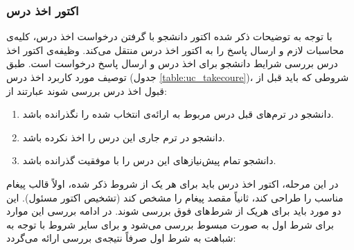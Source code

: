 \subsubsection{ اکتور اخذ درس}
\label{section:takeCourse}
با توجه به توضیحات ذکر شده اکتور دانشجو با گرفتن درخواست اخذ درس، کلیه‌ی محاسبات لازم و ارسال پاسخ را به اکتور اخذ درس منتقل می‌کند. وظیفه‌ی اکتور اخذ درس بررسی شرایط دانشجو برای اخذ درس و ارسال پاسخ درخواست است. طبق توصیف مورد کاربرد اخذ درس (جدول \ref{table:uc_takecoure})، شروطی که باید قبل از قبول اخذ درس بررسی شوند عبارتند از:
\begin{enumerate}
\item دانشجو در ترم‌های قبل درس مربوط به ارائه‌ی انتخاب شده را  نگذرانده باشد.
\item دانشجو در ترم‌ جاری این درس را اخذ نکرده باشد.
\item دانشجو تمام پیش‌نیاز‌های این درس را با موفقیت گذرانده باشد.
\end{enumerate}
در این مرحله، اکتور اخذ درس باید برای هر یک از شروط ذکر شده، اولاً قالب پیغام مناسب را طراحی کند، ثانیاً مقصد پیغام را مشخص کند (تشخیص اکتور مسئول). این دو مورد باید برای هریک از شرط‌های فوق بررسی شوند. در ادامه بررسی این موارد برای شرط اول به صورت مبسوط بررسی می‌شود و برای سایر شروط با توجه به شباهت به شرط اول صرفاً نتیجه‌ی بررسی ارائه می‌گردد:
